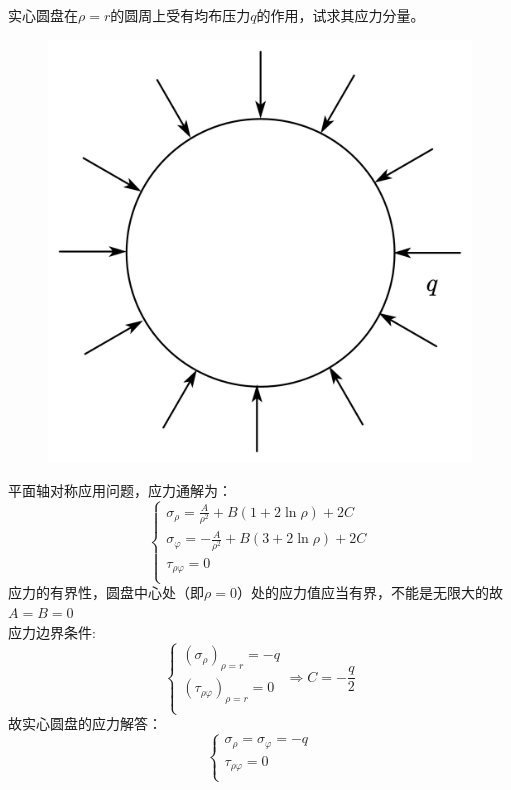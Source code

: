 \begin{example}
	实心圆盘在$\rho = r$的圆周上受有均布压力$q$的作用，试求其应力分量。
\end{example}
\begin{figure}[!h]
	\centering
	\includegraphics[scale=0.25]{figure/4-6.png}
\end{figure}
	\begin{remark}
		平面轴对称应用问题，应力通解为：
		\begin{equation*}
		\begin{cases}
		\sigma _{\rho}=\frac{A}{\rho ^2}+B\left( 1+2\ln \rho \right) +2C\\
		\sigma _{\varphi}=-\frac{A}{\rho ^2}+B\left( 3+2\ln \rho \right) +2C\\
		\tau _{\rho \varphi}=0\\
		\end{cases}
		\end{equation*}
		应力的有界性，圆盘中心处（即$\rho=0$）处的应力值应当有界，不能是无限大的故$A=B=0$
		\\
		应力边界条件:\[\begin{cases}
		\left( \sigma _{\rho} \right) _{\rho =r}=-q\\
		\left( \tau _{\rho \varphi} \right) _{\rho =r}=0\\
		\end{cases}\Longrightarrow C=-\frac{q}{2}\]
		故实心圆盘的应力解答：\[\begin{cases}
		\sigma _{\rho}=\sigma _{\varphi}=-q\\
		\tau _{\rho \varphi}=0\\
		\end{cases}\]
	\end{remark}

